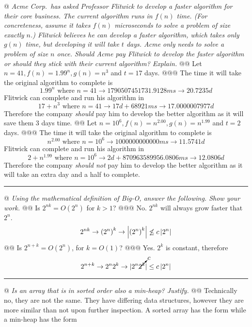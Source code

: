 \documentclass[10pt]{article}
\begin{document}
\begin{easylist}[enumerate]
    @ \textit{Acme Corp.\ has asked Professor Flitwick to develop a faster algorithm for their core business. The current algorithm runs in $f(n)$ time. (For concreteness, assume it takes $f(n)$ microseconds to solve a problem of size exactly $n$.) Flitwick believes he can develop a faster algorithm, which takes only $g(n)$ time, but developing it will take $t$ days. Acme only needs to solve a problem of size $n$ once. Should Acme pay Flitwick to develop the faster algorithm or should they stick with their current algorithm? Explain.}
    @@ Let $n = 41, f (n) = 1.99^n , g(n) = n^3$ and $t = 17$ days.
    @@@ The time it will take the original algorithm to complete is
        \[ 1.99^n \text{ where } n=41 \to 1790507451731.9128 ms \to 20.7235 d \]
        Flitwick can complete and run his algorithm in
        \[ 17 + n^3 \text{ where } n=41 \to 17 d + 68921 ms \to 17.0000007977 d \]
        Therefore the company \textit{should} pay him to develop the better algorithm as it will save them 3 days time.
    @@ Let $n = 10^6 , f (n) = n^{2.00} , g(n) = n^{1.99}$ and $t = 2$ days.
    @@@ The time it will take the original algorithm to complete is
        \[ n^{2.00} \text{ where } n=10^6 \to 1000000000000 ms \to 11.5741 d \]
        Flitwick can complete and run his algorithm in
        \[ 2 + n^{1.99} \text{ where } n=10^6 \to 2 d + 870963589956.0806 ms \to 12.0806 d \]
        Therefore the company \textit{should not} pay him to develop the better algorithm as it will take an extra day and a half to complete.

    \rule{3in}{0.5pt}

    @ \textit{Using the mathematical definition of Big-O, answer the following. Show your work.}
    @@ Is $2^{nk} = O(2^n)$ for $k > 1$?
    @@@ No. $2^{nk}$ will always grow faster that $2^n$.
        \[ 2^{nk} \to {(2^n)}^k \to \left\lvert {(2^n)}^k \right\rvert \not\le c \left\lvert 2^n \right\rvert \]
    @@ Is $2^{n+k} = O(2^n)$, for $k = O(1)$?
    @@@ Yes. $2^k$ is constant, therefore
        \[ 2^{n+k} \to 2^n 2^k \to \vert {2^n \cancelto{c}{2^k}} \vert \le c \left\lvert 2^n \right\rvert \]

    \rule{3in}{0.5pt}

    @ \textit{Is an array that is in sorted order also a min-heap? Justify.}
    @@ Technically no, they are not the same. They have differing data structures, however they are more similar than not upon further inspection. A sorted array has the form {\ttfamily [1, 2, 3, 4, 5]} while a min-heap has the form


\end{easylist}
\end{document}
